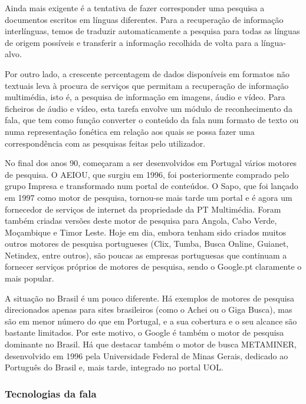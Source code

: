 \documentclass[]{../metanetpaper}
\begin{document}
\begin{multicols}{2}
Ainda mais exigente é a tentativa de fazer cor\-res\-pon\-der uma pesquisa a documentos escritos em línguas diferentes. Para a recuperação de informação interlínguas, temos de traduzir automaticamente a pesquisa para todas as línguas de origem possíveis e transferir a informação recolhida de volta para a língua-alvo. 

Por outro lado, a crescente percentagem de dados disponíveis em formatos não textuais leva à procura de serviços que permitam a recuperação de informação multimédia, isto é, a pesquisa de informação em imagens, áudio e vídeo. Para ficheiros de áudio e vídeo, esta tarefa envolve um módulo de reconhecimento da fala, que tem como função converter o conteúdo da fala num formato de texto ou numa representação fonética em relação aos quais se possa fazer uma correspondência com as pesquisas feitas pelo utilizador.

No final dos anos 90, começaram a ser desenvolvidos em Portugal vários motores de pesquisa. O AEIOU, que surgiu em 1996, foi posteriormente comprado pelo grupo Impresa e transformado num portal de conteúdos\cite{aeiou}. O Sapo, que foi lançado em 1997 como motor de pesquisa, tornou-se mais tarde um portal e é agora um fornecedor de serviços de internet da propriedade da PT Multimédia\cite{sapo}. Foram também criadas versões deste motor de pesquisa para Angola, Cabo Verde, Moçambique e Timor Leste. Hoje em dia, embora tenham sido criados muitos outros motores de pesquisa portugueses (Clix, Tumba, Busca Online, Guianet, Netindex, entre outros)\cite{colossus}, são poucas as empresas portuguesas que continuam a fornecer serviços próprios de motores de pesquisa, sendo o Google.pt claramente o mais popular.

A situação no Brasil é um pouco diferente. Há exemplos de motores de pesquisa direcionados apenas para sites brasileiros (como o Achei\cite{achei} ou o Giga Busca\cite{busca}), mas são em menor número do que em Portugal, e a sua cobertura e o seu alcance são bastante limitados. Por este motivo, o Google é também o motor de pesquisa dominante no Brasil. Há que destacar também o motor de busca METAMINER, desenvolvido em 1996 pela Universidade Federal de Minas Gerais, dedicado ao Português do Brasil e, mais tarde, integrado no portal UOL.
  
\subsubsection{Tecnologias da fala}


\end{multicols}
\end{document}
